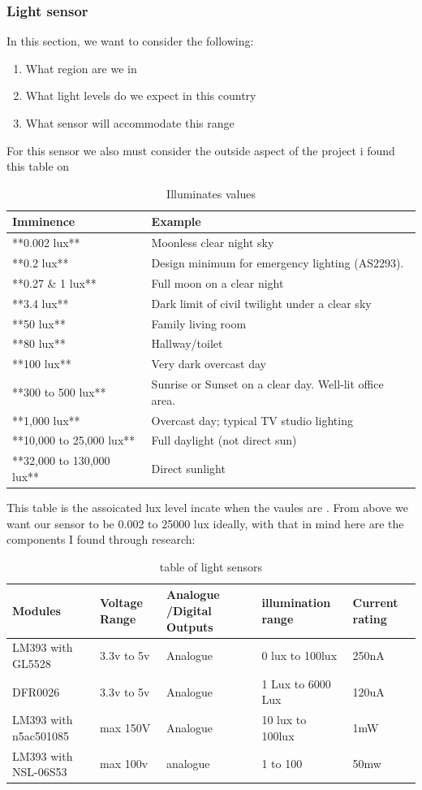 \subsubsection{Light sensor}
In this section, we want to consider the following:
\begin{enumerate}
	\item What region are we in 
	\item What light levels do we  expect in this  country
	\item What sensor  will  accommodate this  range
\end{enumerate}
\newpage
For this sensor we also must consider the outside aspect of the  project  i found this table on \cite{wiki_2023}
	\begin{table}[h!]
	\centering
	\begin{tabular}{|l|l|}
	\hline
		Imminence & Example \\ \hline
		**0.002 lux** & Moonless clear night sky \\ \hline
		**0.2 lux** & Design minimum for emergency lighting (AS2293). \\ \hline
		**0.27 \& 1 lux** & Full moon on a clear night \\ \hline
		**3.4 lux** & Dark limit of civil twilight under a clear sky \\ \hline
		**50 lux** & Family living room \\ \hline
		**80 lux** & Hallway/toilet \\ \hline
		**100 lux** & Very dark overcast day \\ \hline
		**300 to 500 lux** & Sunrise or Sunset on a clear day. Well-lit office area. \\ \hline
		**1,000 lux** & Overcast day; typical TV studio lighting \\ \hline
		**10,000 to 25,000 lux** & Full daylight (not direct sun) \\ \hline
		**32,000 to 130,000 lux** & Direct sunlight \\ \hline
	\end{tabular}
	\caption{Illuminates values}
	\label{Illuminates values}
\end{table}
	This table is the  assoicated lux level  incate when the vaules are . 
	From  above we want our sensor to be 0.002 to 25000 lux ideally, with that in mind here are the components I found  through research:
	\begin{table}[h!]
	\small
	\centering
	\begin{tabular}{|l|l|l|l|l|}
	\hline
		Modules & Voltage Range & Analogue /Digital Outputs & illumination range & Current rating \\ 
		\hline
		LM393 with GL5528 & 3.3v to 5v & Analogue & 0 lux to 100lux & 250nA \\ 
		\hline
		DFR0026 & 3.3v to 5v & Analogue & 1 Lux to 6000 Lux & 120uA \\ \hline
		LM393 with n5ac501085 & max 150V & Analogue & 10 lux to 100lux & 1mW \\ 
		\hline
		LM393 with NSL-06S53 & max 100v & analogue & 1 to 100 & 50mw \\ \hline
	\end{tabular}
	\caption{table of light sensors}
	\label{table of light sensors}
\end{table}
